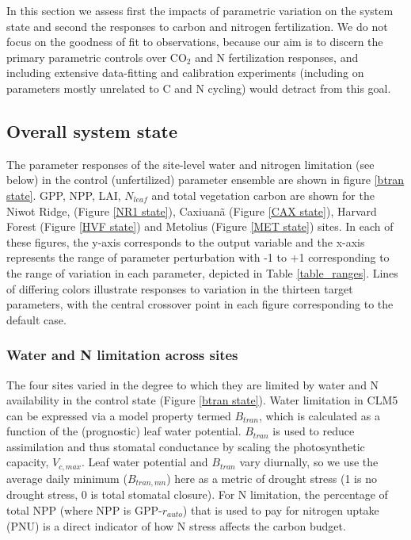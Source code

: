 \usepackage{}\documentclass[draft,linenumbers]{agujournal}
\begin{document}
In this section we assess first the impacts of parametric variation on the system state and second the responses to carbon and nitrogen fertilization. We do not focus on the goodness of fit to observations, because our aim is to discern the primary parametric controls over CO$_{2}$ and N fertilization responses, and including extensive data-fitting and calibration experiments (including on parameters mostly unrelated to C and N cycling) would detract from this goal. 

\subsection{Overall system state}
The parameter responses of the site-level water and nitrogen limitation (see below) in the control (unfertilized) parameter ensemble are shown in figure \ref{btran state}. GPP, NPP, LAI, $N_{leaf}$ and total vegetation carbon are shown for the Niwot Ridge, (Figure \ref{NR1 state}), Caxiuan\~a (Figure \ref{CAX state}), Harvard Forest (Figure \ref{HVF state}) and Metolius (Figure \ref{MET state}) sites. In each of these figures, the y-axis corresponds to the output variable and the x-axis represents the range of parameter perturbation with -1 to +1 corresponding to the range of variation in each parameter, depicted in Table \ref{table_ranges}. Lines of differing colors illustrate responses to variation in the thirteen target parameters, with the central crossover point in each figure corresponding to the default case.

\subsubsection{Water and N limitation across sites}
The four sites varied in the degree to which they are limited by water and N availability in the control state (Figure \ref{btran state}). Water limitation in CLM5 can be expressed via a model property termed $B_{tran}$, which is calculated as a function of the (prognostic) leaf water potential. $B_{tran}$  is used to reduce assimilation and thus stomatal conductance by scaling the photosynthetic capacity, $V_{c,max}$. Leaf water potential and $B_{tran}$ vary diurnally, so we use the average daily minimum ($B_{tran,mn}$) here as a metric of drought stress (1 is no drought stress, 0 is total stomatal closure). For N limitation, the percentage of total NPP (where NPP is GPP-$r_{auto}$) that is used to pay for nitrogen uptake (PNU) is a direct indicator of how N stress affects the carbon budget. 
\end{document}
